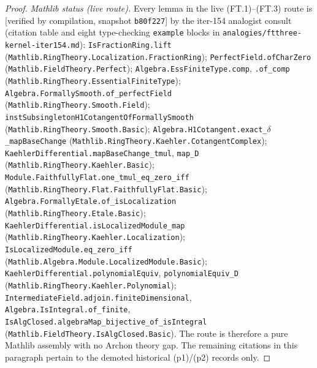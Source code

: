 \begin{proof}
  \emph{Mathlib status (live route).} Every lemma in the live (FT.1)--(FT.3) route is [verified by compilation, snapshot \texttt{b80f227}] by the iter-154 analogist consult (citation table and eight type-checking \texttt{example} blocks in \texttt{analogies/ftthree-kernel-iter154.md}): \texttt{IsFractionRing.lift} (\texttt{Mathlib.RingTheory.Localization.FractionRing}); \texttt{PerfectField.ofCharZero} (\texttt{Mathlib.FieldTheory.Perfect}); \texttt{Algebra.EssFiniteType.comp}, \texttt{.of\_comp} (\texttt{Mathlib.RingTheory.EssentialFiniteType}); \texttt{Algebra.FormallySmooth.of\_perfectField} (\texttt{Mathlib.RingTheory.Smooth.Field}); \texttt{instSubsingletonH1CotangentOfFormallySmooth} (\texttt{Mathlib.RingTheory.Smooth.Basic}); \texttt{Algebra.H1Cotangent.exact\_\(\delta\)\_mapBaseChange} (\texttt{Mathlib.RingTheory.Kaehler.CotangentComplex}); \texttt{KaehlerDifferential.mapBaseChange\_tmul}, \texttt{map\_D} (\texttt{Mathlib.RingTheory.Kaehler.Basic}); \texttt{Module.FaithfullyFlat.one\_tmul\_eq\_zero\_iff} (\texttt{Mathlib.RingTheory.Flat.FaithfullyFlat.Basic}); \texttt{Algebra.FormallyEtale.of\_isLocalization} (\texttt{Mathlib.RingTheory.Etale.Basic}); \texttt{KaehlerDifferential.isLocalizedModule\_map} (\texttt{Mathlib.RingTheory.Kaehler.Localization}); \texttt{IsLocalizedModule.eq\_zero\_iff} (\texttt{Mathlib.Algebra.Module.LocalizedModule.Basic}); \texttt{KaehlerDifferential.polynomialEquiv}, \texttt{polynomialEquiv\_D} (\texttt{Mathlib.RingTheory.Kaehler.Polynomial}); \texttt{IntermediateField.adjoin.finiteDimensional}, \texttt{Algebra.IsIntegral.of\_finite}, \texttt{IsAlgClosed.algebraMap\_bijective\_of\_isIntegral} (\texttt{Mathlib.FieldTheory.IsAlgClosed.Basic}). The route is therefore a pure Mathlib assembly with no Archon theory gap. The remaining citations in this paragraph pertain to the demoted historical (p1)/(p2) records only.


\end{proof}
